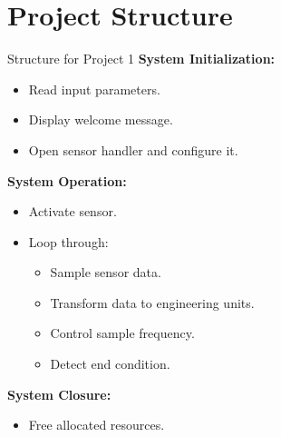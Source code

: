 \section{Project Structure}
\begin{frame}{Structure for Project 1}
    \textbf{System Initialization:}
    \begin{itemize}
        \item Read input parameters.
        \item Display welcome message.
        \item Open sensor handler and configure it.
    \end{itemize}
    \textbf{System Operation:}
    \begin{itemize}
        \item Activate sensor.
        \item Loop through:
        \begin{itemize}
            \item Sample sensor data.
            \item Transform data to engineering units.
            \item Control sample frequency.
            \item Detect end condition.
        \end{itemize}
    \end{itemize}
    \textbf{System Closure:}
    \begin{itemize}
        \item Free allocated resources.
    \end{itemize}
\end{frame}


